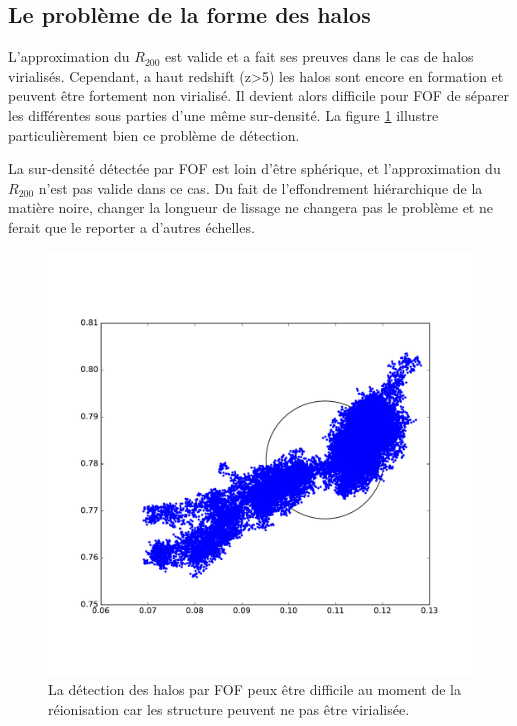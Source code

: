 \subsection{Le problème de la forme des halos}


L'approximation du $R_{200}$ est valide et a fait ses preuves dans le cas de halos virialisés.  %
Cependant, a haut redshift (z>5) les halos sont encore en formation et peuvent être fortement non virialisé.
Il devient alors difficile pour FOF de séparer les différentes sous parties d'une même sur-densité.
La figure \ref{fig:part_halo} illustre particulièrement bien ce problème de détection.

La sur-densité détectée par \ac{FOF} est loin d'être sphérique, et l'approximation du $R_{200}$ n'est pas valide dans ce cas.
Du fait de l'effondrement hiérarchique de la matière noire, changer la longueur de lissage ne changera pas le problème et ne ferait que le reporter a d'autres échelles.


\begin{figure}[bth]
        \includegraphics[width=.95\textwidth]{img/03/part_halo_R200.pdf} 
        \caption{La détection des halos par FOF peux être difficile au moment de la réionisation car les structure peuvent ne pas être virialisée.
        }
 		\label{fig:part_halo}
\end{figure}



